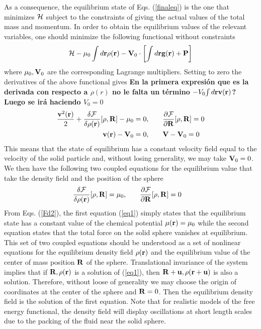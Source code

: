 \documentclass[b5paper,openright,11pt]{book}
\newcommand{\Note}[1]{{\bf \color{red}#1}}    %
\begin{document}
As a consequence, the equilibrium state of Eqs. (\ref{finaleq}) is the
one that minimizes ${\cal H}$ subject to the constraints of giving the
actual values of the total mass  and momentum.  In order to obtain the
equilibrium values of  the relevant variables, one  should minimize the
following functional without constraints
\begin{align}
  {\cal H}-\mu_0\int d{\bf r} \rho({\bf r})-{\bf V}_0\cdot\left[\int d{\bf r}{\bf g}({\bf r})+{\bf P}\right]
\end{align}
where    $\mu_0,{\bf   V}_0$    are    the   corresponding    Lagrange
multipliers. Setting  to zero the derivatives of  the above functional
gives  \Note{En la primera expresión que es la derivada con respecto a $\rho(r)$ no le falta un término $-V_0{\int d{\bf r}\bf v(r)}$? Luego se irá haciendo $V_0=0$}
\begin{align}
  \frac{{\bf v}^2({\bf r})}{2}
+\frac{\delta {\cal F}}{\delta\rho({\bf r})}[\rho,{\bf R}]-\mu_0&=0,\quad
&&\frac{\partial {\cal F}}{\partial {\bf R}}[\rho,{\bf R}]=0
\nonumber\\
{\bf v}({\bf r})-{\bf V}_0&=0,\quad
&&{\bf V}-{\bf V}_0=0
\label{eq01}
\end{align}
This means that the state of equilibrium has a constant velocity field
equal  to the  velocity  of  the solid  particle  and, without  losing
generality, we may take ${\bf V}_0=0$.  We then have the following two
coupled  equations for  the equilibrium  value that  take the  density
field and the position of the sphere
\begin{align}
\frac{\delta {\cal F}}{\delta\rho({\bf r})}[\rho,{\bf R}]&=\mu_0,\quad
&&
\frac{\partial {\cal F}}{\partial {\bf R}}[\rho,{\bf R}]=0
\label{eq1}
\end{align}
From Eqs.   (\ref{Fd2}), the first equation  (\ref{eq1}) simply states
that  the equilibrium  state  has  a constant  value  of the  chemical
potential $\mu({\bf  r})=\mu_0$ while the second  equation states that
the total force on the solid  sphere vanishes at equilibrium. This set
of two  coupled equations should be  understood as a set  of nonlinear
equations for  the equilibrium density  field $\rho({\bf r})$  and the
equilibrium value of the center  of mass position ${\bf R}$ of the sphere.  Translational
invariance of the system implies that  if ${\bf R},\rho({\bf r})$ is a
solution of (\ref{eq1}), then  ${\bf R}+{\bf u},\rho({\bf r}+{\bf u})$
is also  a solution.   Therefore, without loose  of generality  we may
choose the origin of coordinates at the center of the sphere and ${\bf
  R}=0$. Then  the equilibrium  density field is  the solution  of the
first equation.   Note that  for realistic models  of the  free energy
functional,  the  density field  will  display  oscillations at  short
length scales due  to the packing of the fluid  near the solid sphere.
\end{document}
